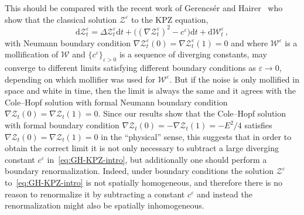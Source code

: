 \documentclass[10pt]{amsart}
\theoremstyle{definition}\newtheorem{defi}[theo]{Definition}\newtheorem{rema}[theo]{Remark}\newtheorem{exam}[theo]{Example}\newtheorem{exem}[theo]{Example}\newtheorem{nota}[theo]{Notation}
\newcommand{\mc}[1]{{\mathcal #1}}
\renewcommand{\mc}[1]{{\mathcal #1}}
\newcommand*{\dd}{\mathrm{d}}
\newcommand*{\dt}{\dd t}
\begin{document}
This should be compared with the recent work of Gerencs\'er and Hairer~\cite{Gerencser2018} who show that the classical solution $\mc Z^\varepsilon$ to the KPZ equation,
\begin{equation}\label{eq:GH-KPZ-intro}
\dd\mc Z^\varepsilon_t = \Delta \mc Z^\varepsilon_t \dt + \big((\nabla\mc Z^\varepsilon_t)^2 - c^\varepsilon\big) \dt + \dd\mc W^\varepsilon_t \,,
\end{equation}
with Neumann boundary condition $\nabla \mc Z^\varepsilon_t(0) = \nabla \mc Z^\varepsilon_t(1) = 0$ and where $\mc W^\varepsilon$ is a mollification of $\mc W$ and $\{c^\varepsilon\}_{\varepsilon>0}$ is a sequence of diverging constants, may converge to different limits satisfying different boundary conditions as $\varepsilon \to 0$, depending on which mollifier was used for $\mc W^\varepsilon$. But if the noise is only mollified in space and white in time, then the limit is always the same and it agrees with the Cole--Hopf solution with formal Neumann boundary condition $\nabla \mc Z_t(0) = \nabla \mc Z_t(1) = 0$. Since our results show that the Cole--Hopf solution with formal boundary condition $\nabla \mc Z_t(0) = -\nabla \mc Z_t(1) = -E^2/4$ satisfies $\nabla \mc Z_t(0) = \nabla \mc Z_t(1) = 0$ in the ``physical'' sense, this suggests that in order to obtain the correct limit it is not only necessary to subtract a large diverging constant $c^\varepsilon$ in~\eqref{eq:GH-KPZ-intro}, but additionally one should perform a boundary renormalization. Indeed, under boundary conditions the solution $\mc Z^\varepsilon$ to~\eqref{eq:GH-KPZ-intro} is not spatially homogeneous, and therefore there is no reason to renormalize it by subtracting a constant $c^\varepsilon$ and instead the renormalization might also be spatially inhomogeneous.
\end{document}
